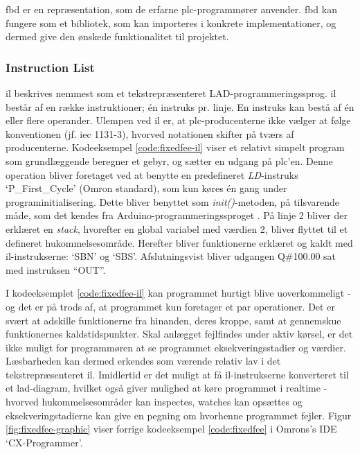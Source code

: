 
\noindent \gls{fbd} er en repræsentation, som de erfarne \gls{plc}-programmører anvender. \gls{fbd} kan fungere som et bibliotek, som kan importeres i konkrete implementationer, og dermed give den ønskede funktionalitet til projektet. \cite{FDB_desc}

\subsubsection{Instruction List}
\gls{il} beskrives nemmest som et tekstrepræsenteret LAD-programmeringssprog. \gls{il} består af en række instruktioner; én instruks pr. linje. En instruks kan bestå af én eller flere operander. Ulempen ved \gls{il} er, at \gls{plc}-producenterne ikke vælger at følge konventionen (jf. \gls{iec} 1131-3), hvorved notationen skifter på tværs af producenterne. Kodeeksempel \ref{code:fixedfee-il} viser et relativt simpelt program som grundlæggende beregner et gebyr, og sætter en udgang på \gls{plc}'en. Denne operation bliver foretaget ved at benytte en predefineret \textit{LD}-instruks \enquote*{P\_First\_Cycle} (Omron standard), som kun køres én gang under programinitialisering. Dette bliver benyttet som \textit{init()}-metoden, på tilsvarende måde, som det kendes fra Arduino-programmeringssproget \cite{ardiono_code_init}. På linje 2 bliver der erklæret en \textit{stack}, hvorefter en global variabel med værdien 2, bliver flyttet til et defineret hukommelsesområde. Herefter bliver funktionerne erklæret og kaldt med \gls{il}-instrukserne: \enquote*{SBN} og \enquote*{SBS}. Afslutningsvist bliver udgangen Q\#100.00 sat med instruksen \enquote{OUT}. 


\noindent I kodeeksemplet \ref{code:fixedfee-il} kan programmet hurtigt blive uoverkommeligt - og det er på trods af, at programmet kun foretager et par operationer. Det er svært at adskille funktionerne fra hinanden, deres kroppe, samt at gennemskue funktionernes kaldstidspunkter. Skal anlægget fejlfindes under aktiv kørsel, er det ikke muligt for programmøren at se programmet eksekveringsstadier og værdier. Læsbarheden kan dermed erkendes som værende relativ lav i det tekstrepræsenteret \gls{il}. Imidlertid er det muligt at få \gls{il}-instrukserne konverteret til et \gls{lad}-diagram, hvilket også giver mulighed at køre programmet i realtime - hvorved hukommelsesområder kan inspectes, watches kan opsættes og eksekveringstadierne kan give en pegning om hvorhenne programmet fejler. Figur \ref{fig:fixedfee-graphic} viser forrige kodeeksempel \ref{code:fixedfee} i Omrons's IDE \enquote*{CX-Programmer}.

